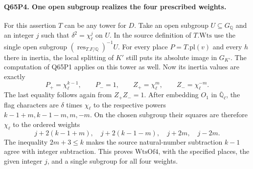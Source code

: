 \paragraph{Q65P4. One open subgroup realizes the four prescribed weights.}
For this assertion $T$ can be any tower for $D$. Take an open
subgroup $U\subseteq G_{\mathbb Q}$ and an integer $j$ such that
$\delta^2=\chi_\ell^j$ on $U$. In the source definition of
$T.\mathrm{Wts}$ use the single open subgroup
$(\operatorname{res}_{T.F/\mathbb Q})^{-1}U$.
For every place $P=T.\mathrm{pl}(v)$ and every $h$ there in
inertia, the local splitting of $K'$ still puts its absolute image
in $G_{K'}$. The computation of Q65P1 applies on this tower as
well. Now its inertia values are exactly
\[
 P_+=\chi_\ell^{k-1},\qquad P_-=1,\qquad
 Z_+=\chi_\ell^m,\qquad Z_-=\chi_\ell^{-m}.
\]
The last equality follows again from $Z_+Z_-=1$. After embedding
$O_1$ in $\overline{\mathbb Q}_\ell$, the flag characters are
$\delta$ times $\chi_\ell$ to the respective powers
$k-1+m,k-1-m,m,-m$. On the chosen subgroup their squares are
therefore $\chi_\ell$ to the ordered weights
\[
 j+2(k-1+m),\quad j+2(k-1-m),\quad j+2m,\quad j-2m .
\]
The inequality $2m+3\le k$ makes the source natural-number
subtraction $k-1$ agree with integer subtraction. This proves
$\mathrm{WtsOf4}$, with the specified places, the given integer
$j$, and a single subgroup for all four weights.
